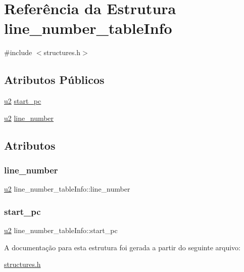 \hypertarget{structline__number__tableInfo}{}\section{Referência da Estrutura line\+\_\+number\+\_\+table\+Info}
\label{structline__number__tableInfo}


{\ttfamily \#include $<$structures.\+h$>$}

\subsection*{Atributos Públicos}
\begin{DoxyCompactItemize}
\item 
\hyperlink{lista__operandos_8h_a732cde1300aafb73b0ea6c2558a7a54f}{u2} \hyperlink{structline__number__tableInfo_a09fe2870e59f80caeeb2b2473e9c07f0}{start\+\_\+pc}
\item 
\hyperlink{lista__operandos_8h_a732cde1300aafb73b0ea6c2558a7a54f}{u2} \hyperlink{structline__number__tableInfo_a3c73371368db11b50865dd474b9e2a7b}{line\+\_\+number}
\end{DoxyCompactItemize}


\subsection{Atributos}
\mbox{\label{structline__number__tableInfo_a3c73371368db11b50865dd474b9e2a7b}} 
\subsubsection{\texorpdfstring{line\+\_\+number}{line\_number}}
{\footnotesize\ttfamily \hyperlink{lista__operandos_8h_a732cde1300aafb73b0ea6c2558a7a54f}{u2} line\+\_\+number\+\_\+table\+Info\+::line\+\_\+number}

\mbox{\label{structline__number__tableInfo_a09fe2870e59f80caeeb2b2473e9c07f0}} 
\subsubsection{\texorpdfstring{start\+\_\+pc}{start\_pc}}
{\footnotesize\ttfamily \hyperlink{lista__operandos_8h_a732cde1300aafb73b0ea6c2558a7a54f}{u2} line\+\_\+number\+\_\+table\+Info\+::start\+\_\+pc}



A documentação para esta estrutura foi gerada a partir do seguinte arquivo\+:\begin{DoxyCompactItemize}
\item 
\hyperlink{structures_8h}{structures.\+h}\end{DoxyCompactItemize}
